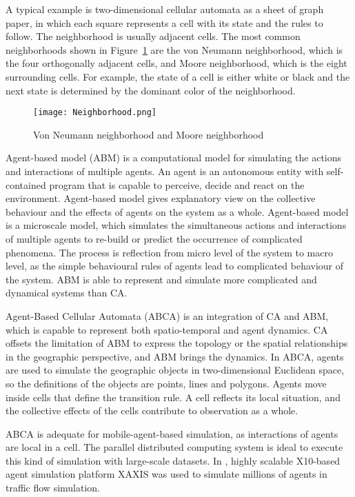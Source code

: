 A typical example is two-dimensional cellular automata as a sheet of graph paper, in which each square represents a cell with its state and the rules to follow. The neighborhood is usually adjacent cells. The most common neighborhoods shown in Figure~\ref{fig:Neighborhood} are the von Neumann neighborhood, which is the four orthogonally adjacent cells, and Moore neighborhood, which is the eight surrounding cells. For example, the state of a cell is either white or black and the next state is determined by the dominant color of the neighborhood.

\begin{figure}
  \begin{center}
    \texttt{[image: Neighborhood.png]}
    \caption{Von Neumann neighborhood and Moore neighborhood}
    \label{fig:Neighborhood}
  \end{center}
\end{figure} 

Agent-based model (ABM) is a computational model for simulating the actions and interactions of multiple agents. An agent is an autonomous entity with self-contained program that is capable to perceive, decide and react on the environment. Agent-based model gives explanatory view on the collective behaviour and the effects of agents on the system as a whole. Agent-based model is a microscale model, which simulates the simultaneous actions and interactions of multiple agents to re-build or predict the occurrence of complicated phenomena. The process is reflection from micro level of the system to macro level, as the simple behavioural rules of agents lead to complicated behaviour of the system. ABM is able to represent and simulate more complicated and dynamical systems than CA.

Agent-Based Cellular Automata (ABCA)\cite{sudhira2005framework} is an integration of CA and ABM, which is capable to represent both spatio-temporal and agent dynamics. CA offsets the limitation of ABM to express the topology or the spatial relationships in the geographic perspective, and ABM brings the dynamics. In ABCA, agents are used to simulate the geographic objects in two-dimensional Euclidean space, so the definitions of the objects are points, lines and polygons. Agents move inside cells that define the transition rule. A cell reflects its local situation, and the collective effects of the cells contribute to observation as a whole.

ABCA is adequate for mobile-agent-based simulation, as interactions of agents are local in a cell. The parallel distributed computing system is ideal to execute this kind of simulation with large-scale datasets. In \cite{suzumura2012highly}, highly scalable X10-based agent simulation  platform XAXIS was used to simulate millions of agents in traffic flow simulation.

